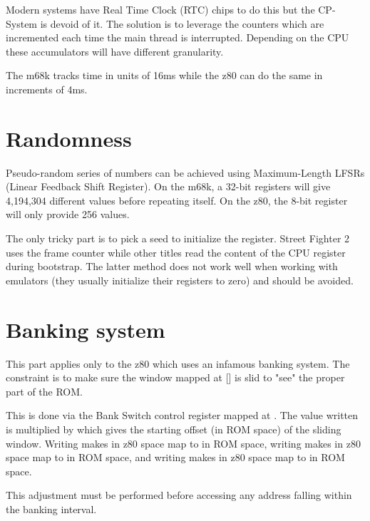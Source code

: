 Modern systems have Real Time Clock (RTC) chips to do this but the CP-System is devoid of it. The solution is to leverage the counters which are incremented each time the main thread is interrupted. Depending on the CPU these accumulators will have different granularity.

The m68k tracks time in units of 16ms while the z80 can do the same in increments of 4ms.


\section{Randomness}
Pseudo-random series of numbers can be achieved using Maximum-Length LFSRs (Linear Feedback Shift Register). On the m68k, a 32-bit registers will give 4,194,304 different values before repeating itself. On the z80, the 8-bit register will only provide 256 values.

The only tricky part is to pick a seed to initialize the register. Street Fighter 2 uses the frame counter while other titles read the content of the CPU register during bootstrap. The latter method does not work well when working with emulators (they usually initialize their registers to zero) and should be avoided.

\section{Banking system}
\label{memory_bank_programming}
This part applies only to the z80 which uses an infamous banking system. The constraint is to make sure the window mapped at [] is slid to "see" the proper part of the ROM. 

This is done via the Bank Switch control register mapped at . The value written is multiplied by  which gives the starting offset (in ROM space) of the sliding window. Writing  makes  in z80 space map to  in ROM space, writing  makes  in z80 space map to  in ROM space, and writing  makes  in z80 space map to  in ROM space.
 
This adjustment must be performed before accessing any address falling within the banking interval. 
